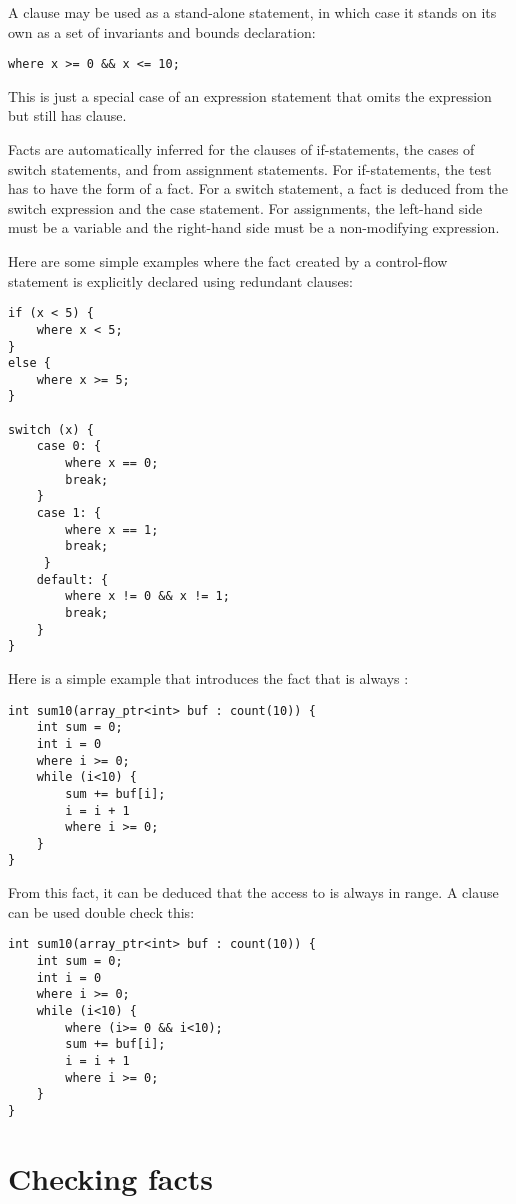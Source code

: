 A  clause may be used as a stand-alone statement, 
in which case it stands on its own as a set of invariants and bounds
declaration:
\begin{lstlisting}
where x >= 0 && x <= 10;
\end{lstlisting}
This is just a special case of an expression statement
that omits the expression but still has  clause.

Facts are automatically inferred for the clauses of if-statements, 
the cases of switch statements, and from assignment statements. 
For if-statements, the test has to have
the form of a fact. For a switch statement, a fact is deduced from the
switch expression and the case statement.  For assignments, the
left-hand side must be a variable and the right-hand side must be
a non-modifying expression.

Here are some simple examples where the fact created by a control-flow
statement is explicitly declared using redundant  clauses:

\begin{lstlisting}
if (x < 5) {
    where x < 5;
}
else {
    where x >= 5;
} 

switch (x) {
    case 0: {
        where x == 0;
        break;
    }
    case 1: {
        where x == 1;
        break;
     }   
    default: {
        where x != 0 && x != 1;
        break;
    }
}
\end{lstlisting}

Here is a simple example that introduces the fact that  is always
:

\begin{lstlisting}
int sum10(array_ptr<int> buf : count(10)) {
    int sum = 0;
    int i = 0
    where i >= 0;
    while (i<10) {
        sum += buf[i];
        i = i + 1
        where i >= 0;
    }
}
\end{lstlisting}

From this fact, it can be deduced that the access to  is always in
range. A  clause can be used double check this:

\begin{lstlisting}
int sum10(array_ptr<int> buf : count(10)) {
    int sum = 0;
    int i = 0
    where i >= 0;
    while (i<10) {
        where (i>= 0 && i<10);
        sum += buf[i];
        i = i + 1
        where i >= 0;
    }
}
\end{lstlisting}

\section{Checking facts}

